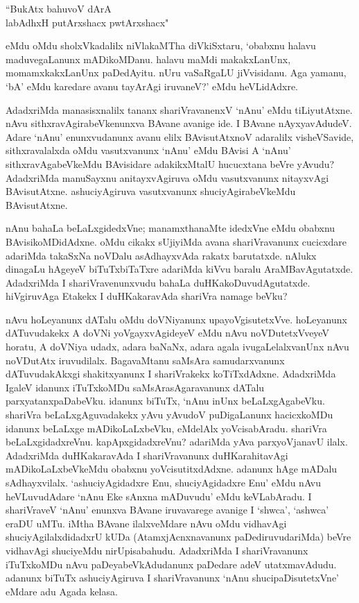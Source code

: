 \begin{shloka}
``BukAtx bahuvoV dArA\\
labAdhxH putArxshacx pwtArxshacx"
\end{shloka}

\noindent eMdu oMdu sholxVkadalilx niVlakaMTha diVkiSxtaru, `obabxnu halavu maduvegaLanunx mADikoMDanu. halavu maMdi makakxLanUnx, momamxkakxLanUnx paDedAyitu. nUru vaSaRgaLU jiVvisidanu. Aga yamanu, `bA' eMdu karedare avanu tayArAgi iruvaneV?' eMdu heVLidAdxre.

AdadxriMda manasisxnalilx tananx shariVravanenxV `nAnu' eMdu tiLiyutAtxne. nAvu sithxravAgirabeVkenunxva BAvane avanige ide. I BAvane nAyxyavAdudeV. Adare `nAnu' enunxvudanunx avanu elilx BAvisutAtxnoV adaralilx visheVSavide, sithxravalalxda oMdu vasutxvanunx `nAnu' eMdu BAvisi A `nAnu' sithxravAgabeVkeMdu BAvisidare adakikxMtalU hucucxtana beVre yAvudu? AdadxriMda manuSayxnu anitayxvAgiruva oMdu vasutxvanunx nitayxvAgi BAvisutAtxne. ashuciyAgiruva vasutxvanunx shuciyAgirabeVkeMdu BAvisutAtxne.

nAnu bahaLa beLaLxgidedxVne; manamxthanaMte idedxVne eMdu obabxnu BAvisikoMDidAdxne. oMdu cikakx sUjiyiMda avana shariVravanunx cucicxdare adariMda takaSxNa noVDalu asAdhayxvAda rakatx barutatxde. nAlukx dinagaLu hAgeyeV biTuTxbiTaTxre adariMda kiVvu baralu AraMBavAgutatxde. AdadxriMda I shariVravenunxvudu bahaLa duHKakoDuvudAgutatxde. hiVgiruvAga Etakekx I duHKakaravAda shariVra namage beVku?

nAvu hoLeyanunx dATalu oMdu doVNiyanunx upayoVgisutetxVve. hoLeyanunx dATuvudakekx A doVNi yoVgayxvAgideyeV eMdu nAvu noVDutetxVveyeV horatu, A doVNiya udadx, adara baNaNx, adara agala ivugaLelalxvanUnx nAvu noVDutAtx iruvudilalx. BagavaMtanu saMsAra samudarxvanunx dATuvudakAkxgi shakitxyanunx I shariVrakekx koTiTxdAdxne. AdadxriMda IgaleV idanunx iTuTxkoMDu saMsArasAgaravanunx dATalu parxyatanxpaDabeVku. idanunx biTuTx, `nAnu inUnx beLaLxgAgabeVku. shariVra beLaLxgAguvadakekx yAvu yAvudoV puDigaLanunx hacicxkoMDu idanunx beLaLxge mADikoLaLxbeVku, eMdelAlx yoVcisabAradu. shariVra beLaLxgidadxreVnu. kapApxgidadxreVnu? adariMda yAva parxyoVjanavU ilalx. AdadxriMda duHKakaravAda I shariVravanunx duHKarahitavAgi mADikoLaLxbeVkeMdu obabxnu yoVcisutitxdAdxne. adanunx hAge mADalu sAdhayxvilalx. `ashuciyAgidadxre Enu, shuciyAgidadxre Enu' eMdu nAvu heVLuvudAdare `nAnu Eke sAnxna mADuvudu' eMdu keVLabAradu. I shariVraveV `nAnu' enunxva BAvane iruvavarege avanige I `shwca', `ashwca' eraDU uMTu. iMtha BAvane ilalxveMdare nAvu oMdu vidhavAgi shuciyAgilalxdidadxrU kUDa (AtamxjAcnxnavanunx paDediruvudariMda) beVre vidhavAgi shuciyeMdu nirUpisabahudu. AdadxriMda I shariVravanunx iTuTxkoMDu nAvu paDeyabeVkAdudanunx paDedare adeV utatxmavAdudu. adanunx biTuTx ashuciyAgiruva I shariVravanunx `nAnu shucipaDisutetxVne' eMdare adu Agada kelasa.

